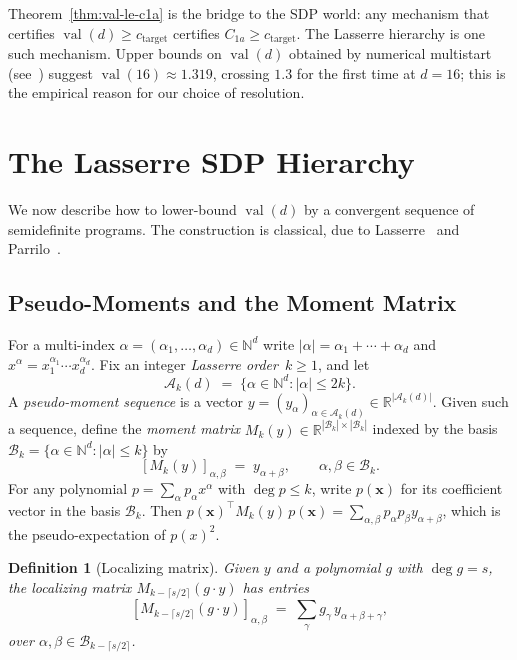 \documentclass[11pt, letterpaper]{article}
\theoremstyle{paperplain}
\theoremstyle{paperdef}
\newtheorem{definition}[theorem]{Definition}
\newcommand{\R}{\mathbb{R}}
\newcommand{\N}{\mathbb{N}}
\newcommand{\val}{\operatorname{val}}
\begin{document}
Theorem~\ref{thm:val-le-c1a} is the bridge to the SDP world: any
mechanism that certifies $\val(d)\ge c_{\mathrm{target}}$ certifies
$C_{1a}\ge c_{\mathrm{target}}$.  The Lasserre hierarchy is one such
mechanism.  Upper bounds on $\val(d)$ obtained by numerical
multistart (see~\cite{BajajCS2026}) suggest
$\val(16)\approx 1.319$, crossing $1.3$ for the first time at
$d=16$; this is the empirical reason for our choice of resolution.


\section{The Lasserre SDP Hierarchy}\label{sec:lasserre}

We now describe how to lower-bound $\val(d)$ by a convergent sequence
of semidefinite programs.  The construction is classical, due to
Lasserre~\cite{Lasserre2001,Lasserre2015} and Parrilo~\cite{Parrilo03}.

\subsection{Pseudo-Moments and the Moment Matrix}

For a multi-index $\alpha=(\alpha_1,\ldots,\alpha_d)\in\N^d$ write
$|\alpha|=\alpha_1+\cdots+\alpha_d$ and $x^\alpha =
x_1^{\alpha_1}\cdots x_d^{\alpha_d}$.  Fix an integer
\emph{Lasserre order}~$k\ge 1$, and let
\[
  \mathcal{A}_k(d) \;=\; \{\alpha\in\N^d:|\alpha|\le 2k\}.
\]
A \emph{pseudo-moment sequence} is a vector
$y=(y_\alpha)_{\alpha\in\mathcal{A}_k(d)}\in\R^{|\mathcal{A}_k(d)|}$.
Given such a sequence, define the \emph{moment matrix}
$M_k(y)\in\R^{|\mathcal{B}_k|\times|\mathcal{B}_k|}$ indexed by the
basis $\mathcal{B}_k=\{\alpha\in\N^d:|\alpha|\le k\}$ by
\[
  [M_k(y)]_{\alpha,\beta} \;=\; y_{\alpha+\beta},
  \qquad \alpha,\beta\in\mathcal{B}_k.
\]
For any polynomial $p=\sum_\alpha p_\alpha x^\alpha$ with
$\deg p\le k$, write $p(\mathbf{x})$ for its coefficient vector in the
basis $\mathcal{B}_k$.  Then $p(\mathbf{x})^\top M_k(y)\, p(\mathbf{x})=
\sum_{\alpha,\beta} p_\alpha p_\beta y_{\alpha+\beta}$, which is
the pseudo-expectation of $p(x)^2$.

\begin{definition}[Localizing matrix]\label{def:localizing}
Given $y$ and a polynomial $g$ with $\deg g=s$, the
\emph{localizing matrix} $M_{k-\lceil s/2\rceil}(g\cdot y)$ has entries
\[
  [M_{k-\lceil s/2\rceil}(g\cdot y)]_{\alpha,\beta}
  \;=\;
  \sum_\gamma g_\gamma\, y_{\alpha+\beta+\gamma},
\]
over $\alpha,\beta\in\mathcal{B}_{k-\lceil s/2\rceil}$.
\end{definition}
\end{document}
